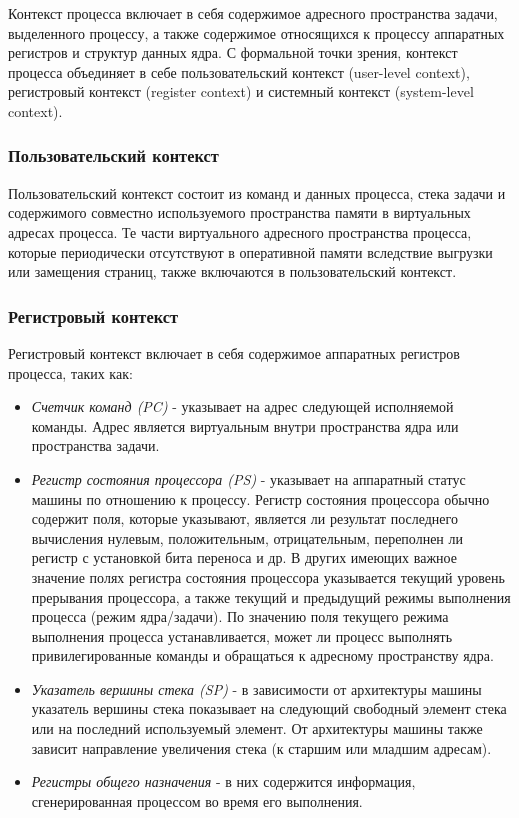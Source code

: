 \documentclass[14pt,a4paper,report]{report}
\begin{document}
Контекст процесса включает в себя содержимое адресного пространства задачи, выделенного процессу, а также содержимое относящихся к процессу аппаратных регистров и структур данных ядра. С формальной точки зрения, контекст процесса объединяет в себе пользовательский контекст (user-level context), регистровый контекст (register context) и системный контекст (system-level context).

\subsubsection{Пользовательский контекст}

Пользовательский контекст состоит из команд и данных процесса, стека задачи и содержимого совместно используемого пространства памяти в виртуальных адресах процесса. Те части виртуального адресного пространства процесса, которые периодически отсутствуют в оперативной памяти вследствие выгрузки или замещения страниц, также включаются в пользовательский контекст.

\subsubsection{Регистровый контекст}

Регистровый контекст включает в себя содержимое аппаратных регистров процесса, таких как:

\begin{itemize}
	\item \emph{Счетчик команд (PC)} - указывает на адрес следующей исполняемой команды. Адрес является виртуальным внутри пространства ядра или пространства задачи.
	\item \emph{Регистр состояния процессора (PS)} - указывает на аппаратный статус машины по отношению к процессу. Регистр состояния процессора обычно содержит поля, которые указывают, является ли результат последнего вычисления нулевым, положительным, отрицательным, переполнен ли регистр с установкой бита переноса и др. В других имеющих важное значение полях регистра состояния процессора указывается текущий уровень прерывания процессора, а также текущий и предыдущий режимы выполнения процесса (режим ядра/задачи). По значению поля текущего режима выполнения процесса устанавливается, может ли процесс выполнять привилегированные команды и обращаться к адресному пространству ядра.
	\item \emph{Указатель вершины стека (SP)} - в зависимости от архитектуры машины указатель вершины стека показывает на следующий свободный элемент стека или на последний используемый элемент. От архитектуры машины также зависит направление увеличения стека (к старшим или младшим адресам).
	\item \emph{Регистры общего назначения} - в них содержится информация, сгенерированная процессом во время его выполнения. 
\end{itemize}
\end{document}
